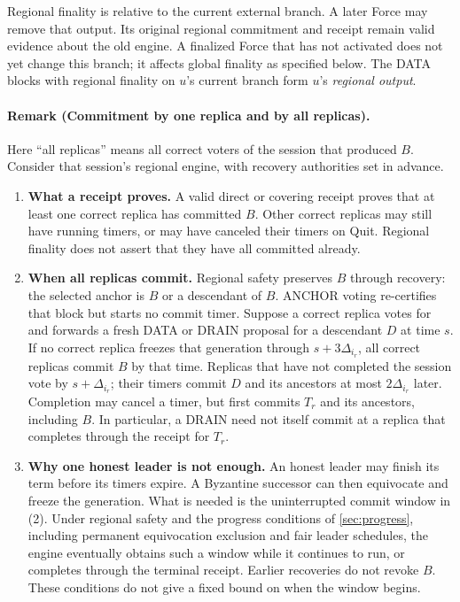 \documentclass[11pt,a4paper]{article}
\newcommand{\defterm}[1]{\textcolor{rrBlue}{\textit{#1}}}
\begin{document}
Regional finality is relative to the current external branch. A later
Force may remove that output. Its original regional commitment and
receipt remain valid evidence about the old engine. A finalized Force
that has not activated does not yet change this branch; it affects
global finality as specified below. The DATA blocks with
regional finality on $u$'s current branch form $u$'s \defterm{regional
output}.

\paragraph{Remark (Commitment by one replica and by all replicas).}
Here ``all replicas'' means all correct voters of the session that
produced $B$. Consider that session's regional engine, with recovery
authorities set in advance.
\begin{enumerate}[label=(\arabic*),itemsep=4pt]
\item \textbf{What a receipt proves.} A valid direct or covering
receipt proves that at least one correct replica has committed $B$.
Other correct replicas may still have running timers, or may have
canceled their timers on Quit. Regional finality does not assert that
they have all committed already.

\item \textbf{When all replicas commit.} Regional safety preserves
$B$ through recovery: the selected anchor is $B$ or a descendant of
$B$. ANCHOR voting re-certifies that block but starts no commit timer.
Suppose a correct replica votes for and forwards a fresh DATA or DRAIN
proposal for a descendant $D$ at time $s$. If no correct replica freezes
that generation through $s+3\Delta_{i_r}$, all correct replicas commit
$B$ by that time. Replicas that have not completed the session vote by
$s+\Delta_{i_r}$; their timers commit $D$ and its ancestors at most
$2\Delta_{i_r}$ later. Completion may cancel a timer, but first commits
$T_r$ and its ancestors, including $B$. In particular, a DRAIN need not
itself commit at a replica that completes through the receipt for $T_r$.

\item \textbf{Why one honest leader is not enough.} An honest leader
may finish its term before its timers expire. A Byzantine successor
can then equivocate and freeze the generation. What is needed is the
uninterrupted commit window in (2). Under regional safety and the
progress conditions of \cref{sec:progress}, including permanent
equivocation exclusion and fair leader schedules, the engine eventually
obtains such a window while it continues to run, or completes through
the terminal receipt. Earlier recoveries do not revoke $B$. These
conditions do not give a fixed bound on when the window begins.


\end{enumerate}
\end{document}
